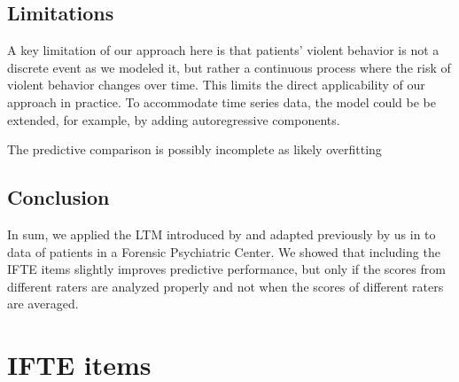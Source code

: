 \documentclass[a4paper,11pt]{article}
\begin{document}
\subsection{Limitations}
A key limitation of our approach here is that patients' violent behavior is not a discrete event as we modeled it, but rather a continuous process where the risk of violent behavior changes over time.
This limits the direct applicability of our approach in practice.
To accommodate time series data, the model could be be extended, for example, by adding autoregressive components.



The predictive comparison is possibly incomplete as  likely overfitting

\subsection{Conclusion}
In sum, we applied the LTM introduced by \textcite{Anders2015cultural} and adapted previously by us in \textcite{vandenBergh2020cultural} to data of patients in a Forensic Psychiatric Center.
We showed that including the IFTE items slightly improves predictive performance, but only if the scores from different raters are analyzed properly and not when the scores of different raters are averaged.



\printbibliography
\newpage

\appendix

\section{IFTE items}
\end{document}
